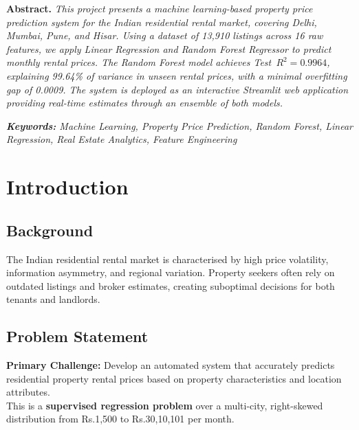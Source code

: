 \documentclass[12pt,a4paper]{article}
\makeatletter
\newcommand{\Rs}{Rs.\@}          %
\makeatother
\begin{document}
\begin{tcolorbox}[enhanced,colback=IceBlue,colframe=Navy,
    borderline west={4pt}{0pt}{Navy},
    boxrule=0.7pt,arc=4pt,left=10pt,right=10pt,top=8pt,bottom=8pt]
  \textbf{\sffamily\color{Navy}Abstract.}\quad\itshape\small
  This project presents a machine learning-based property price prediction system for the
  Indian residential rental market, covering Delhi, Mumbai, Pune, and Hisar. Using a dataset
  of 13,910 listings across 16 raw features, we apply Linear Regression and Random Forest
  Regressor to predict monthly rental prices. The Random Forest model achieves
  Test~$R^{2}=0.9964$, explaining 99.64\% of variance in unseen rental prices, with a
  minimal overfitting gap of 0.0009. The system is deployed as an interactive Streamlit web
  application providing real-time estimates through an ensemble of both models.
\end{tcolorbox}
\vspace{4pt}
{\small\itshape\color{Muted}
  \textbf{Keywords:} Machine Learning, Property Price Prediction, Random Forest, Linear
  Regression, Real Estate Analytics, Feature Engineering}

\tableofcontents\newpage

\section{Introduction}

\subsection{Background}
The Indian residential rental market is characterised by high price volatility, information
asymmetry, and regional variation. Property seekers often rely on outdated listings and broker
estimates, creating suboptimal decisions for both tenants and landlords.

\subsection{Problem Statement}

\begin{corebox}
  \textbf{Primary Challenge:} Develop an automated system that accurately predicts
  residential property rental prices based on property characteristics and location
  attributes.\\[4pt]
  \small This is a \textbf{supervised regression problem} over a multi-city, right-skewed
  distribution from \Rs1,500 to \Rs30,10,101 per month.
\end{corebox}
\end{document}
